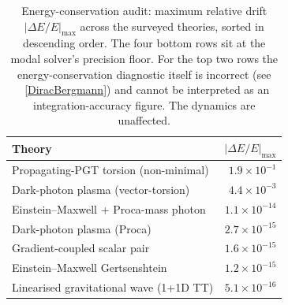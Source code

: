 \begin{table}[h]
  \centering
  \begin{tabular}{lr}
    \toprule
    Theory & $|\Delta E/E|_\mathrm{max}$ \\
    \midrule
    Propagating-PGT torsion (non-minimal)       & $1.9\times 10^{-1}$ \\
    Dark-photon plasma (vector-torsion)        & $4.4\times 10^{-3}$ \\
    Einstein--Maxwell + Proca-mass photon      & $1.1\times 10^{-14}$ \\
    Dark-photon plasma (Proca)                 & $2.7\times 10^{-15}$ \\
    Gradient-coupled scalar pair               & $1.6\times 10^{-15}$ \\
    Einstein--Maxwell Gertsenshtein            & $1.2\times 10^{-15}$ \\
    Linearised gravitational wave (1+1D TT)    & $5.1\times 10^{-16}$ \\
    \bottomrule
  \end{tabular}
  \caption{Energy-conservation audit: maximum relative drift
    $|\Delta E/E|_\mathrm{max}$ across the surveyed theories, sorted
    in descending order. The four bottom rows sit at the modal
    solver's precision floor. For the top two rows the
    energy-conservation diagnostic itself is incorrect (see
   ~\cref{DiracBergmann}) and cannot be interpreted as an
    integration-accuracy figure. The dynamics are unaffected.}
  \label{ConservationAudit}
\end{table}

